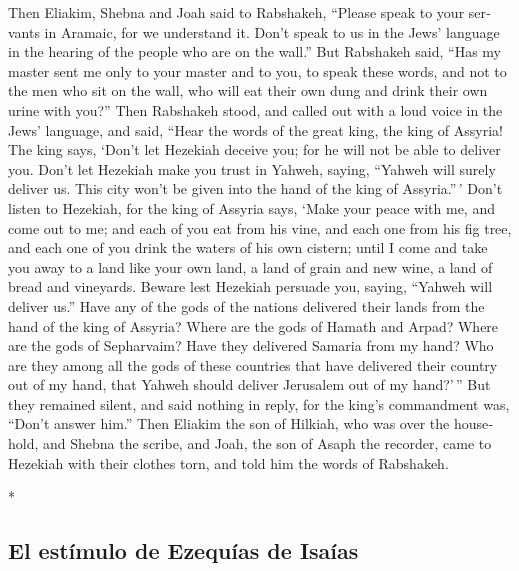 \begin{paracol}{2}
\begin{otherlanguage}{english}
 Then Eliakim, Shebna and Joah said to Rabshakeh,
``Please speak to your servants in Aramaic, for we understand it. Don't
speak to us in the Jews' language in the hearing of the people who are
on the wall.''  But Rabshakeh said, ``Has my master sent
me only to your master and to you, to speak these words, and not to the
men who sit on the wall, who will eat their own dung and drink their own
urine with you?''  Then Rabshakeh stood, and called out
with a loud voice in the Jews' language, and said, ``Hear the words of
the great king, the king of Assyria!  The king says,
`Don't let Hezekiah deceive you; for he will not be able to deliver you.
 Don't let Hezekiah make you trust in Yahweh, saying,
``Yahweh will surely deliver us. This city won't be given into the hand
of the king of Assyria.''\,'  Don't listen to Hezekiah,
for the king of Assyria says, `Make your peace with me, and come out to
me; and each of you eat from his vine, and each one from his fig tree,
and each one of you drink the waters of his own cistern; 
until I come and take you away to a land like your own land, a land of
grain and new wine, a land of bread and vineyards. 
Beware lest Hezekiah persuade you, saying, ``Yahweh will deliver us.''
Have any of the gods of the nations delivered their lands from the hand
of the king of Assyria?  Where are the gods of Hamath and
Arpad? Where are the gods of Sepharvaim? Have they delivered Samaria
from my hand?  Who are they among all the gods of these
countries that have delivered their country out of my hand, that Yahweh
should deliver Jerusalem out of my hand?'\,''  But they
remained silent, and said nothing in reply, for the king's commandment
was, ``Don't answer him.''  Then Eliakim the son of
Hilkiah, who was over the household, and Shebna the scribe, and Joah,
the son of Asaph the recorder, came to Hezekiah with their clothes torn,
and told him the words of Rabshakeh.

\end{otherlanguage}

\switchcolumn[0]*

\hypertarget{el-estuxedmulo-de-ezequuxedas-de-isauxedas}{%
\subsection{El estímulo de Ezequías de
Isaías}\label{el-estuxedmulo-de-ezequuxedas-de-isauxedas}}


\end{paracol}
